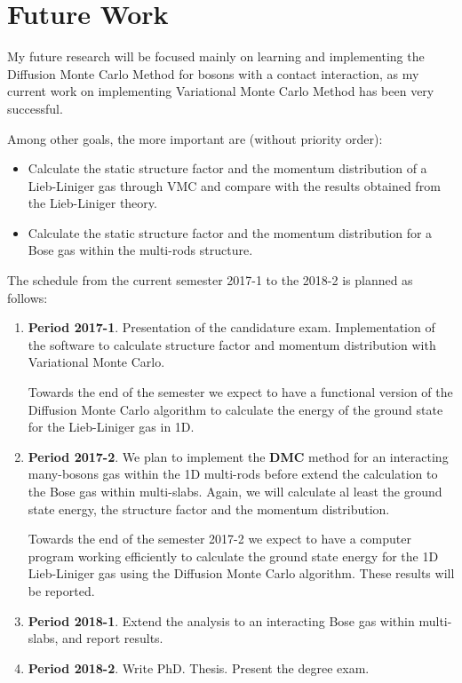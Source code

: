 \chapter{Future Work}

My future research will be focused mainly on learning and implementing the Diffusion Monte Carlo Method for bosons with
a contact interaction, as my current work on implementing Variational Monte Carlo Method has been very successful.

Among other goals, the more important are (without priority order):

\begin{itemize}
	\item Calculate the static structure factor and the momentum distribution of a Lieb-Liniger gas through VMC and compare with the results obtained from the Lieb-Liniger theory.

	\item Calculate the static structure factor and the momentum distribution for a Bose gas within the multi-rods structure.
\end{itemize}



The schedule from the current semester 2017-1 to the 2018-2 is planned as follows:

\begin{enumerate}
	\item \textbf{Period 2017-1}. Presentation of the candidature exam. Implementation of the software to calculate structure factor and momentum distribution with Variational Monte Carlo.

	Towards the end of the semester we expect to have a functional version of the Diffusion Monte Carlo algorithm to calculate the energy of the ground state for the Lieb-Liniger gas in 1D.

	\item \textbf{Period 2017-2}. We plan to implement the \textbf{DMC} method for an interacting many-bosons gas within the 1D multi-rods before extend the calculation to the Bose gas within multi-slabs. Again, we will calculate al least the ground state energy, the structure factor and the momentum distribution.

	Towards the end of the semester 2017-2 we expect to have a computer program working efficiently to calculate the
	ground state energy for the 1D Lieb-Liniger gas using the Diffusion Monte Carlo algorithm. These results will be
	reported.

	\item \textbf{Period 2018-1}. Extend the analysis to an interacting Bose gas within multi-slabs, and report results.

	\item \textbf{Period 2018-2}. Write PhD. Thesis. Present the degree exam.
\end{enumerate}

